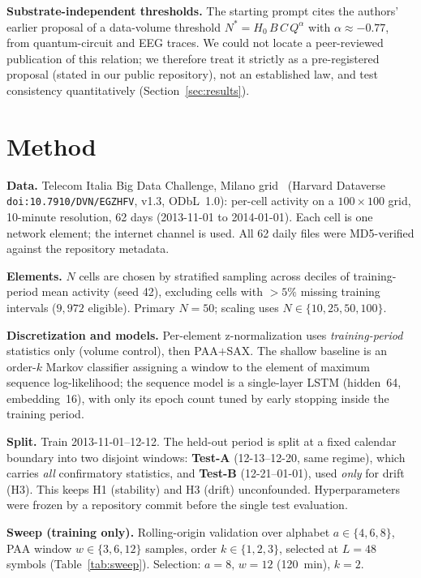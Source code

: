 \documentclass[conference]{IEEEtran}
\begin{document}
\textbf{Substrate-independent thresholds.} The starting prompt cites the
authors' earlier proposal of a data-volume threshold
$N^\ast=H_0\,B\,C\,Q^{\alpha}$ with $\alpha\approx-0.77$, from quantum-circuit
and EEG traces. We could not locate a peer-reviewed publication of this
relation; we therefore treat it strictly as a pre-registered proposal (stated
in our public repository), not an established law, and test consistency
quantitatively (Section~\ref{sec:results}).

\section{Method}\label{sec:method}
\textbf{Data.} Telecom Italia Big Data Challenge, Milano
grid~\cite{barlacchi2015milano} (Harvard Dataverse
\texttt{doi:10.7910/DVN/EGZHFV}, v1.3, ODbL~1.0): per-cell activity on a
$100\times100$ grid, 10-minute resolution, 62 days (2013-11-01 to 2014-01-01).
Each cell is one network element; the internet channel is used. All 62 daily
files were MD5-verified against the repository metadata.

\textbf{Elements.} $N$ cells are chosen by stratified sampling across deciles
of training-period mean activity (seed 42), excluding cells with $>5\%$ missing
training intervals ($9{,}972$ eligible). Primary $N{=}50$; scaling uses
$N\in\{10,25,50,100\}$.

\textbf{Discretization and models.} Per-element z-normalization uses
\emph{training-period} statistics only (volume control), then PAA$+$SAX. The
shallow baseline is an order-$k$ Markov classifier assigning a window to the
element of maximum sequence log-likelihood; the sequence model is a
single-layer LSTM (hidden~64, embedding~16), with only its epoch count tuned by
early stopping inside the training period.

\textbf{Split.} Train 2013-11-01--12-12. The held-out period is split at a
fixed calendar boundary into two disjoint windows: \textbf{Test-A}
(12-13--12-20, same regime), which carries \emph{all} confirmatory statistics,
and \textbf{Test-B} (12-21--01-01), used \emph{only} for drift (H3). This keeps
H1 (stability) and H3 (drift) unconfounded. Hyperparameters were frozen by a
repository commit before the single test evaluation.

\textbf{Sweep (training only).} Rolling-origin validation over alphabet
$a\in\{4,6,8\}$, PAA window $w\in\{3,6,12\}$ samples, order $k\in\{1,2,3\}$,
selected at $L{=}48$ symbols (Table~\ref{tab:sweep}). Selection:
$a{=}8,\,w{=}12$ (120~min), $k{=}2$.
\end{document}
